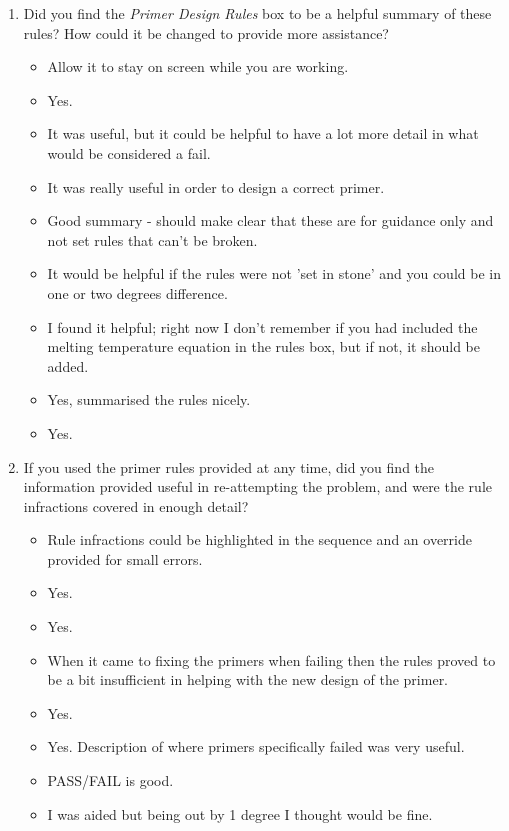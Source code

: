 \documentclass[a4paper]{article}
\begin{document}
\begin{enumerate}
	\item{Did you find the \textit{Primer Design Rules} box to be a helpful summary of these rules? How could it be changed to
			provide more assistance?}
	\begin{itemize}
		\item{Allow it to stay on screen while you are working.}
		\item{Yes.}
		\item{It was useful, but it could be helpful to have a lot more detail in what would be considered a fail.}
		\item{It was really useful in order to design a correct primer.}
		\item{Good summary - should make clear that these are for guidance only and not set rules that can't be broken.}
		\item{It would be helpful if the rules were not 'set in stone' and you could be in one or two degrees difference.}
		\item{I found it helpful; right now I don't remember if you had included the melting temperature equation in the rules
				box, but if not, it should be added.}
		\item{Yes, summarised the rules nicely.}
		\item{Yes.}
	\end{itemize}
	
	\item{If you used the primer rules provided at any time, did you find the information provided useful in re-attempting the
			problem, and were the rule infractions covered in enough detail?}
	\begin{itemize}
		\item{Rule infractions could be highlighted in the sequence and an override provided for small errors.}
		\item{Yes.}
		\item{Yes.}
		\item{When it came to fixing the primers when failing then the rules proved to be a bit insufficient in helping with the
				new design of the primer.}
		\item{Yes.}
		\item{Yes. Description of where primers specifically failed was very useful.}
		\item{PASS/FAIL is good.}
		\item{I was aided but being out by 1 degree I thought would be fine.}
	\end{itemize}
	

\end{enumerate}
\end{document}
